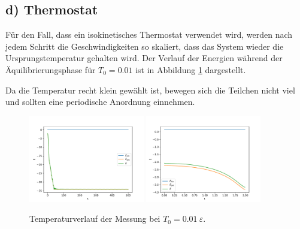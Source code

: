 \FloatBarrier
 \subsection*{d) Thermostat}

Für den Fall, dass ein isokinetisches Thermostat verwendet wird, werden nach jedem Schritt die Geschwindigkeiten so skaliert, dass das System wieder die Ursprungstemperatur gehalten wird.
Der Verlauf der Energien während der Äquilibrierungsphase für $T_0 = 0.01$ ist in Abbildung \ref{fig:thermostat_equi_energy}   dargestellt.

Da die Temperatur recht klein gewählt ist, bewegen sich die Teilchen nicht viel
und sollten eine periodische Anordnung einnehmen.

\begin{figure}
    \centering
    \includegraphics[width=0.45\textwidth]{A1/build/aequi_isokinetisch001_E.pdf}
    \includegraphics[width=0.45\textwidth]{A1/build/aequi_isokinetisch001_EE.pdf}
    \caption{Temperaturverlauf der Messung bei $T_0 = 0.01\:\varepsilon$.}
    \label{fig:thermostat_equi_energy}
\end{figure}
